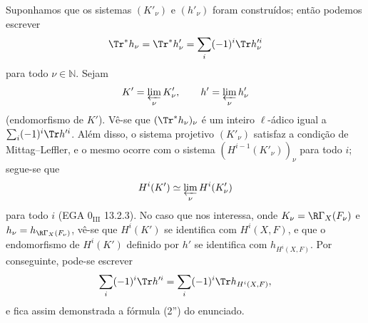 Suponhamos que os sistemas $(K'_\nu)$ e $(h'_\nu)$ foram construídos; então podemos escrever
\[
\Tr^*h_\nu=\Tr^*h'_\nu=\sum_i(-1)^i\Tr h_\nu'^i
\]
para todo $\nu\in\mathbb N$. Sejam
\[
K'=\varprojlim_\nu K'_\nu,
\qquad h'=\varprojlim_\nu h'_\nu
\]
(endomorfismo de $K'$). Vê-se que $(\Tr^*h_\nu)_\nu$ é um inteiro $\ell$-ádico igual a $\sum_i(-1)^i\Tr h'^i$. Além disso, o sistema projetivo $(K'_\nu)$ satisfaz a condição de Mittag--Leffler, e o mesmo ocorre com o sistema $(H^{i-1}(K'_\nu))_\nu$ para todo $i$; segue-se que
\[
H^i(K')\simeq\varprojlim_\nu H^i(K'_\nu)
\]
para todo $i$ (EGA $0_{\mathrm{III}}$ 13.2.3). No caso que nos interessa, onde $K_\nu=\R\Gamma_X(F_\nu)$ e $h_\nu=h_{\R\Gamma_X(F_\nu)}$, vê-se que $H^i(K')$ se identifica com $H^i(X,F)$, e que o endomorfismo de $H^i(K')$ definido por $h'$ se identifica com $h_{H^i(X,F)}$. Por conseguinte, pode-se escrever
\[
\sum_i(-1)^i\Tr h'^i=
\sum_i(-1)^i\Tr h_{H^i(X,F)},
\]
e fica assim demonstrada a fórmula (2'') do enunciado.
